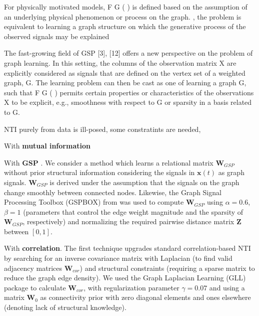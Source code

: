 For physically motivated models, F G ( ) is defined based
on the assumption of an underlying physical phenomenon
or process on the graph. , the problem
is equivalent to learning a graph structure on which the generative process of the observed signals may be explained

The fast-growing field of GSP [3], [12] offers a new perspective on the problem of graph learning. In this setting, the
columns of the observation matrix X are
explicitly considered as signals that are
defined on the vertex set of a weighted
graph, G. The learning problem can then
be cast as one of learning a graph G, such
that F G ( ) permits certain properties or
characteristics of the observations X to be
explicit, e.g., smoothness with respect to
G or sparsity in a basis related to G. 


NTI purely from data is ill-posed, some constratints are needed, 

With \textbf{mutual information} \cite{Villaverde2014MIDERnetworkinference}

With \textbf{GSP} \cite{Dong2019Learninggraphsdata}. We consider a method \cite{Kalofolias2016Howlearngraph} which learns a relational matrix $ \bm{W}_{GSP} $ without prior structural information considering the signals in $\bm{x}(t) $ as graph signals\cite{Dong2019Learninggraphsdata}. $ \bm{W}_{GSP} $ is derived under the assumption that the signals on the graph change smoothly between connected nodes. Likewise, the Graph Signal Processing Toolbox (GSPBOX) from \cite{Perraudin2014GSPBOXtoolboxsignal} was used to compute $ \bm{W}_{GSP} $ using $\alpha = 0.6$, $\beta  = 1$ (parameters that control the edge weight magnitude and the sparsity of $ \bm{W}_{GSP} $, respectively) and normalizing the required pairwise distance matrix $\bm{Z}$ between $[0,1]$.

With \textbf{correlation}. The first technique \cite{Olsson2006unknownsensorsactuators} upgrades standard correlation-based NTI by searching for an inverse covariance matrix with Laplacian (to find valid adjacency matrices $ \bm{W}_{cor} $) and structural constraints (requiring a sparse matrix to reduce the graph edge density). We used the Graph Laplacian Learning (GLL) package \cite{Egilmez2021GraphLaplacianLearning} to calculate $ \bm{W}_{cor} $, with regularization parameter $\gamma = 0.07$ and using a matrix $\bm{W}_0$ as connectivity prior with zero diagonal elements and ones elsewhere (denoting lack of structural knowledge).










